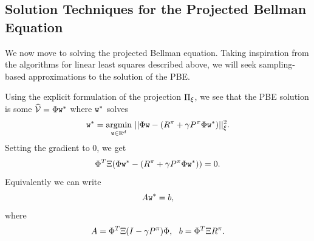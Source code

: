 \subsection{Solution Techniques for the Projected Bellman Equation}\label{ssec:TD_solution_techniques}
We now move to solving the projected Bellman equation. Taking inspiration from the algorithms for linear least squares described above, we will seek sampling-based approximations to the solution of the PBE.

Using the explicit formulation of the projection $\Pi_\xi$, we see that the PBE solution is some $\widehat{\mathcal{V}} = \Phi {\tt w}^*$ where ${\tt w}^*$ solves
$${\tt w}^* = \underset{{{\tt w} \in \mathbb{R}^d}}{\operatorname{argmin}} \ ||\Phi {\tt w} - (R^\pi+\gamma P^\pi\Phi {\tt w}^*)||_\xi^2.$$
Setting the gradient to $0$, we get
$$\Phi^T \Xi (\Phi {\tt w}^* - (R^\pi+\gamma P^\pi \Phi {\tt w}^*)) = 0.$$
Equivalently we can write
$$A {\tt w}^* = b,$$
where
\begin{equation}\label{eq:A_b_TD}
A = \Phi^T \Xi(I-\gamma P^\pi) \Phi, \ \ b = \Phi^T\Xi R^\pi.
\end{equation}

